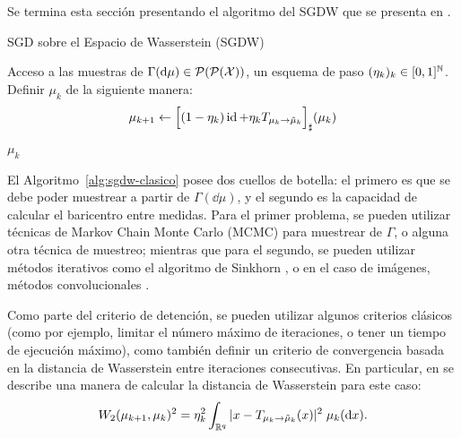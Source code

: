 Se termina esta sección presentando el algoritmo del SGDW que se presenta en \cite{backhoff2022bayesian}.
\begin{algorithm}[H]
    \caption{SGD sobre el Espacio de Wasserstein (SGDW) \cite{backhoff2022bayesian}}
    \label{alg:sgdw-clasico}
    \begin{algorithmic}[1]
        \Require Acceso a las muestras de $\Gamma(\dd \mu) \in \ProbSpace[\ProbSpace]$, un esquema de paso $(\eta_k)_k \in [0, 1]^\N$.
        \Repeat
        \State Definir $\mu_k$ de la siguiente manera:
        \begin{equation}
            \mu_{k+1} \gets \pf{\qty\Big[
                    (1 - \eta_k) \id + \eta_k T_{\mu_k \to \tilde \mu_k}
                ]} (\mu_k)
        \end{equation}
        \State\Return $\mu_k$
    \end{algorithmic}
\end{algorithm}

El Algoritmo~\ref{alg:sgdw-clasico} posee dos cuellos de botella: el primero es que se debe poder muestrear a partir de $\Gamma(\dd \mu)$, y el segundo es la capacidad de calcular el baricentro entre medidas. Para el primer problema, se pueden utilizar técnicas de Markov Chain Monte Carlo (MCMC) \cite{andrieu2003introduction,brooks2011handbook,goodman2010ensemble} para muestrear de $\Gamma$, o alguna otra técnica de muestreo; mientras que para el segundo, se pueden utilizar métodos iterativos como el algoritmo de Sinkhorn \cite{cuturi2013sinkhorn}, o en el caso de imágenes, métodos convolucionales \cite{solomon2015convolutional,janati2020debiased}.

Como parte del criterio de detención, se pueden utilizar algunos criterios clásicos (como por ejemplo, limitar el número máximo de iteraciones, o tener un tiempo de ejecución máximo), como también definir un criterio de convergencia basada en la distancia de Wasserstein entre iteraciones consecutivas. En particular, en \cite{backhoff2022bayesian} se describe una manera de calcular la distancia de Wasserstein para este caso:
\begin{equation}
    \Wasserstein[2]{\mu_{k+1}}{\mu_k}^2 = \eta_k^2 \int_{\R^q} | x - T_{\mu_k \to \tilde \mu_k}(x) |^2 \; \mu_k(\dd x).
\end{equation}




